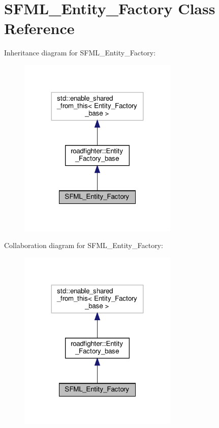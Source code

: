 \hypertarget{classSFML__Entity__Factory}{}\section{S\+F\+M\+L\+\_\+\+Entity\+\_\+\+Factory Class Reference}
\label{classSFML__Entity__Factory}


Inheritance diagram for S\+F\+M\+L\+\_\+\+Entity\+\_\+\+Factory\+:\nopagebreak
\begin{figure}[H]
\begin{center}
\leavevmode
\includegraphics[width=215pt]{classSFML__Entity__Factory__inherit__graph}
\end{center}
\end{figure}


Collaboration diagram for S\+F\+M\+L\+\_\+\+Entity\+\_\+\+Factory\+:\nopagebreak
\begin{figure}[H]
\begin{center}
\leavevmode
\includegraphics[width=215pt]{classSFML__Entity__Factory__coll__graph}
\end{center}
\end{figure}
